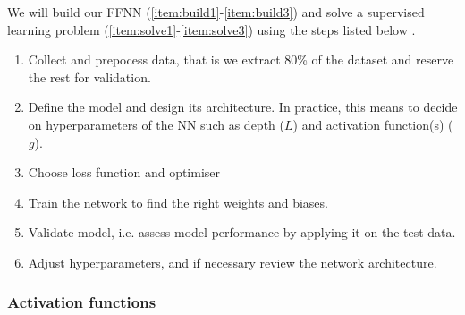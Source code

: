     We will build our FFNN (\ref{item:build1}-\ref{item:build3}) and solve a supervised learning problem (\ref{item:solve1}-\ref{item:solve3}) using the steps listed below \citep{mhjensen}.

    \begin{enumerate}[label=(\roman*)]
        \item\label{item:build1} Collect and prepocess data, that is we extract 80\% of the dataset and reserve the rest for validation. 
        \item\label{item:build2} Define the model and design its architecture. In practice, this means to decide on hyperparameters of the NN such as depth ($L$) and activation function(s) ($g$).
        \item\label{item:build3} Choose loss function and optimiser 
        \item\label{item:solve1} Train the network to find the right weights and biases.
        \item\label{item:solve2} Validate model, i.e. assess model performance by applying it on the test data.
        \item\label{item:solve3} Adjust hyperparameters, and if necessary review the network architecture.
    \end{enumerate}



    \subsubsection{Activation functions}\label{sec:activation_function}

    



